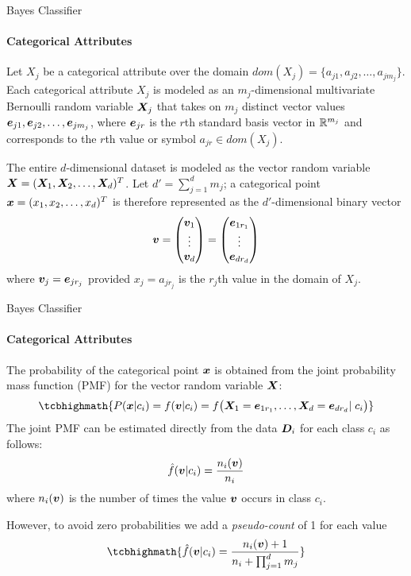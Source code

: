 \begin{frame}{Bayes Classifier}
\framesubtitle{Categorical Attributes}
Let $X_{j}$ be a
categorical attribute over the domain $dom(X_{j}) = \{a_{j1},
a_{j2}, \ldots, a_{jm_{j}}\}$. Each categorical attribute
$X_{j}$ is modeled as an $m_{j}$-dimensional multivariate Bernoulli
random variable ${\boldsymbol X}_{j}$ that takes on $m_{j}$ distinct vector values
${\boldsymbol e}_{j1}, {\boldsymbol e}_{j2}, \dots, {\boldsymbol e}_{jm_{j}}$, where ${\boldsymbol e}_{jr}$ is the
$r$th standard basis vector in ${\mathord{\mathbb R}}^{m_{j}}$ and corresponds to
the $r$th value or symbol $a_{jr} \in dom(X_{j})$. 

\bigskip
The entire
$d$-dimensional dataset is modeled as the vector random variable ${\boldsymbol X} = ({\boldsymbol X}_1, {\boldsymbol X}_2, \ldots,
{\boldsymbol X}_d)^T$. Let $d' = \sum_{j=1}^d m_{j}$; a categorical point ${\boldsymbol x} = (x_1,x_2,\dots,x_d)^T$ is
therefore represented as the $d'$-dimensional binary vector
\begin{align*}
  {\boldsymbol v} = \begin{pmatrix} {\boldsymbol v}_1\\\vdots\\{\boldsymbol v}_d \end{pmatrix}
  = \begin{pmatrix} {\boldsymbol e}_{1r_1}\\\vdots\\{\boldsymbol e}_{dr_d} \end{pmatrix}
\end{align*}
where ${\boldsymbol v}_{j} = {\boldsymbol e}_{jr_{j}}$ provided $x_{j} = a_{jr_{j}}$ is the
$r_{j}$th value in the domain of $X_{j}$. 
\end{frame}



\begin{frame}{Bayes Classifier}
\framesubtitle{Categorical Attributes}
The probability of the
categorical point ${\boldsymbol x}$ is obtained from the joint probability
mass function (PMF) for the vector random variable ${\boldsymbol X}$:
\begin{align*}
\tcbhighmath{
  P(\bx | c_i) = f(\bv|c_i)  =
    f\bigl(\bX_1=\be_{1r_1}, \dots, \bX_d=\be_{dr_d} | \;c_i\bigr)
}
\end{align*}
The joint PMF can be estimated directly from the data
${\boldsymbol D}_i$ for each class $c_i$ as follows:
\begin{align*}
    \kern3pt\hat{\kern-3pt f}({\boldsymbol v}|c_i) = {n_i({\boldsymbol v}) \over n_i}
\end{align*}
where $n_i({\boldsymbol v})$ is the number of times the value ${\boldsymbol v}$ occurs in
class $c_i$.

However, to avoid zero probabilities we add a 
{\em pseudo-count} of 1 for each value 
\begin{align*}
\tcbhighmath{
    \hf(\bv|c_i) = {n_i(\bv)+1 \over n_i + \prod_{j=1}^d m_{j}}
}
\end{align*}
\end{frame}


